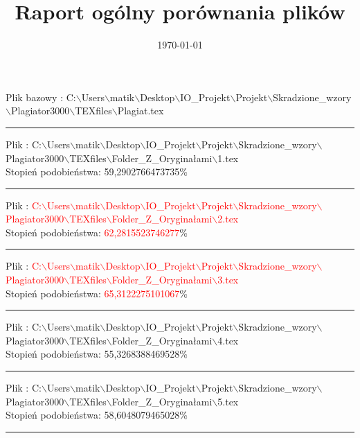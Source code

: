 \documentclass{article}
\begin{document}
\title{\huge\bfseries Raport ogólny porównania plików }
\date{\today}
\maketitle
\begin{flushleft}
Plik bazowy : C:$\backslash$Users$\backslash$matik$\backslash$Desktop$\backslash$IO\_Projekt$\backslash$Projekt$\backslash$Skradzione\_wzory$\backslash$Plagiator3000$\backslash$TEXfiles$\backslash$Plagiat.tex
\end{flushleft}
\hrule
\begin{flushleft}
Plik : C:$\backslash$Users$\backslash$matik$\backslash$Desktop$\backslash$IO\_Projekt$\backslash$Projekt$\backslash$Skradzione\_wzory$\backslash$Plagiator3000$\backslash$TEXfiles$\backslash$Folder\_Z\_Oryginałami$\backslash$1.tex\\
{\huge Stopień podobieństwa: 59,2902766473735\%} \\ 

\end{flushleft}
\hrule
\begin{flushleft}
Plik : \textcolor{Red}{C:$\backslash$Users$\backslash$matik$\backslash$Desktop$\backslash$IO\_Projekt$\backslash$Projekt$\backslash$Skradzione\_wzory$\backslash$Plagiator3000$\backslash$TEXfiles$\backslash$Folder\_Z\_Oryginałami$\backslash$2.tex}\\
{\huge Stopień podobieństwa: \textcolor{Red}{62,2815523746277}\%} \\ 

\end{flushleft}
\hrule
\begin{flushleft}
Plik : \textcolor{Red}{C:$\backslash$Users$\backslash$matik$\backslash$Desktop$\backslash$IO\_Projekt$\backslash$Projekt$\backslash$Skradzione\_wzory$\backslash$Plagiator3000$\backslash$TEXfiles$\backslash$Folder\_Z\_Oryginałami$\backslash$3.tex}\\
{\huge Stopień podobieństwa: \textcolor{Red}{65,3122275101067}\%} \\ 

\end{flushleft}
\hrule
\begin{flushleft}
Plik : C:$\backslash$Users$\backslash$matik$\backslash$Desktop$\backslash$IO\_Projekt$\backslash$Projekt$\backslash$Skradzione\_wzory$\backslash$Plagiator3000$\backslash$TEXfiles$\backslash$Folder\_Z\_Oryginałami$\backslash$4.tex\\
{\huge Stopień podobieństwa: 55,3268388469528\%} \\ 

\end{flushleft}
\hrule
\begin{flushleft}
Plik : C:$\backslash$Users$\backslash$matik$\backslash$Desktop$\backslash$IO\_Projekt$\backslash$Projekt$\backslash$Skradzione\_wzory$\backslash$Plagiator3000$\backslash$TEXfiles$\backslash$Folder\_Z\_Oryginałami$\backslash$5.tex\\
{\huge Stopień podobieństwa: 58,6048079465028\%} \\ 

\end{flushleft}
\hrule
\end{document}
